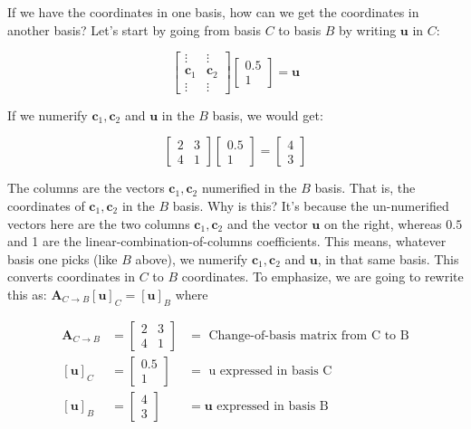 \documentclass[main.tex]{subfiles}
\begin{document}
    If we have the coordinates in one basis, how can we get the coordinates in another basis? Let's start by going from basis $C$ to basis $B$ by writing $\mathbf{u}$ in $C$:
    
    $$
    \left[\begin{array}{cc}
    \vdots & \vdots \\
    \mathbf{c}_{1} & \mathbf{c}_{2} \\
    \vdots & \vdots
    \end{array}\right]\left[\begin{array}{r}
    0.5 \\
    1
    \end{array}\right]=\mathbf{u}
    $$
    
    If we numerify $\mathbf{c}_{1}, \mathbf{c}_{2}$ and $\mathbf{u}$ in the $B$ basis, we would get:
    
    $$
    \left[\begin{array}{ll}
    2 & 3 \\
    4 & 1
    \end{array}\right]\left[\begin{array}{r}
    0.5 \\
    1
    \end{array}\right]=\left[\begin{array}{l}
    4 \\
    3
    \end{array}\right]
    $$
    
    The columns are the vectors $\mathbf{c}_{1}, \mathbf{c}_{2}$ numerified in the $B$ basis. That is, the coordinates of $\mathbf{c}_{1}, \mathbf{c}_{2}$ in the $B$ basis. Why is this? It's because the un-numerified vectors here are the two columns $\mathbf{c}_{1}, \mathbf{c}_{2}$ and the vector $\mathbf{u}$ on the right, whereas $0.5$ and 1 are the linear-combination-of-columns coefficients. This means, whatever basis one picks (like $B$ above), we numerify $\mathbf{c}_{1}, \mathbf{c}_{2}$ and $\mathbf{u}$, in that same basis. This converts coordinates in $C$ to $B$ coordinates. To emphasize, we are going to rewrite this as: $\mathbf{A}_{C \rightarrow B}[\mathbf{u}]_{C}=[\mathbf{u}]_{B}$ where
    
    $$
    \begin{aligned}
    \mathbf{A}_{C \rightarrow B} 
    & =\left[\begin{array}{ll}
    2 & 3 \\
    4 & 1
    \end{array}\right]
    & =\text { Change-of-basis matrix from } \mathrm{C} \text { to } \mathrm{B} \\
    [\mathbf{u}]_{C} 
    & =\left[\begin{array}{r}
    0.5 \\
    1
    \end{array}\right]
    & =\text { u expressed in basis } \mathrm{C} \\
    [\mathbf{u}]_{B} &=\left[\begin{array}{l}
    4 \\
    3
    \end{array}\right]
    & =\mathbf{u} \text { expressed in basis } \mathrm{B}
    \end{aligned} 
    $$
    
\end{document}

